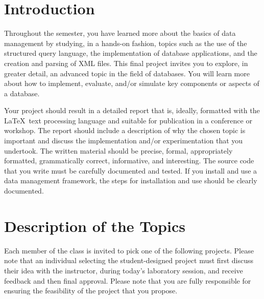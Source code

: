


\usepackage[compact]{titlesec}



\section*{Introduction}

Throughout the semester, you have learned more about the basics of data management by studying, in a hands-on fashion,
topics such as the use of the structured query language, the implementation of database applications, and the
creation and parsing of XML files.  This final project invites you to explore, in greater detail, an advanced topic in
the field of databases. You will learn more about how to implement, evaluate, and/or simulate key components or aspects
of a database. 

Your project should result in a detailed report that is, ideally, formatted with the \LaTeX\ text processing language
and suitable for publication in a conference or workshop.  The report should include a description of why the chosen
topic is important and discuss the implementation and/or experimentation that you undertook.  The written material
should be precise, formal, appropriately formatted, grammatically correct, informative, and interesting.  The source
code that you write must be carefully documented and tested.  If you install and use a data management framework, the
steps for installation and use should be clearly documented. 

\section*{Description of the Topics}

Each member of the class is invited to pick one of the following projects.  Please note that an individual selecting the
student-designed project must first discuss their idea with the instructor, during today's laboratory session, and
receive feedback and then final approval.  Please note that you are fully responsible for ensuring the feasibility of
the project that you propose.


